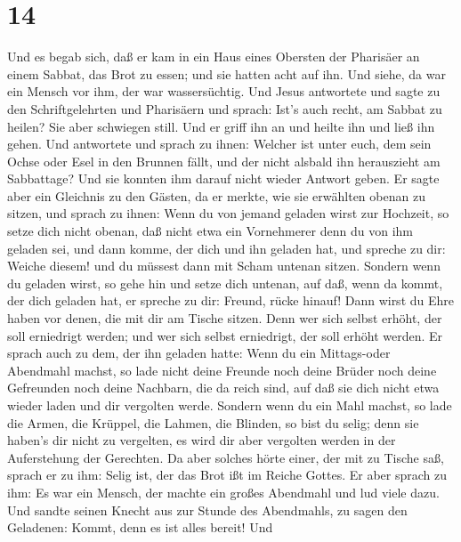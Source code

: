 \hypertarget{section-13}{%
\section{14}\label{section-13}}

 Und es begab sich, daß er kam in ein Haus eines Obersten
der Pharisäer an einem Sabbat, das Brot zu essen; und sie hatten acht
auf ihn.  Und siehe, da war ein Mensch vor ihm, der war
wassersüchtig.  Und Jesus antwortete und sagte zu den
Schriftgelehrten und Pharisäern und sprach: Ist's auch recht, am Sabbat
zu heilen?  Sie aber schwiegen still. Und er griff ihn an
und heilte ihn und ließ ihn gehen.  Und antwortete und
sprach zu ihnen: Welcher ist unter euch, dem sein Ochse oder Esel in den
Brunnen fällt, und der nicht alsbald ihn herauszieht am Sabbattage?
 Und sie konnten ihm darauf nicht wieder Antwort geben.
 Er sagte aber ein Gleichnis zu den Gästen, da er merkte,
wie sie erwählten obenan zu sitzen, und sprach zu ihnen: 
Wenn du von jemand geladen wirst zur Hochzeit, so setze dich nicht
obenan, daß nicht etwa ein Vornehmerer denn du von ihm geladen sei,
 und dann komme, der dich und ihn geladen hat, und spreche
zu dir: Weiche diesem! und du müssest dann mit Scham untenan sitzen.
 Sondern wenn du geladen wirst, so gehe hin und setze dich
untenan, auf daß, wenn da kommt, der dich geladen hat, er spreche zu
dir: Freund, rücke hinauf! Dann wirst du Ehre haben vor denen, die mit
dir am Tische sitzen.  Denn wer sich selbst erhöht, der
soll erniedrigt werden; und wer sich selbst erniedrigt, der soll erhöht
werden.  Er sprach auch zu dem, der ihn geladen hatte: Wenn
du ein Mittags-oder Abendmahl machst, so lade nicht deine Freunde noch
deine Brüder noch deine Gefreunden noch deine Nachbarn, die da reich
sind, auf daß sie dich nicht etwa wieder laden und dir vergolten werde.
 Sondern wenn du ein Mahl machst, so lade die Armen, die
Krüppel, die Lahmen, die Blinden,  so bist du selig; denn
sie haben's dir nicht zu vergelten, es wird dir aber vergolten werden in
der Auferstehung der Gerechten.  Da aber solches hörte
einer, der mit zu Tische saß, sprach er zu ihm: Selig ist, der das Brot
ißt im Reiche Gottes.  Er aber sprach zu ihm: Es war ein
Mensch, der machte ein großes Abendmahl und lud viele dazu.
 Und sandte seinen Knecht aus zur Stunde des Abendmahls, zu
sagen den Geladenen: Kommt, denn es ist alles bereit!  Und
